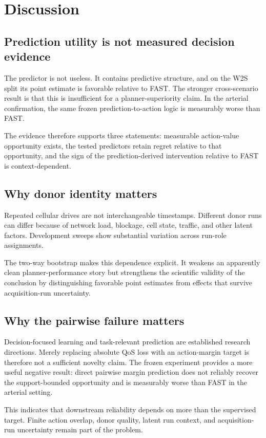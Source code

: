 \documentclass[journal]{IEEEtran}
\begin{document}
\section{Discussion}
\subsection{Prediction utility is not measured decision evidence}
The predictor is not useless. It contains predictive structure, and on the W2S split its point estimate is favorable relative to FAST. The stronger cross-scenario result is that this is insufficient for a planner-superiority claim. In the arterial confirmation, the same frozen prediction-to-action logic is measurably worse than FAST.

The evidence therefore supports three statements: measurable action-value opportunity exists, the tested predictors retain regret relative to that opportunity, and the sign of the prediction-derived intervention relative to FAST is context-dependent.

\subsection{Why donor identity matters}
Repeated cellular drives are not interchangeable timestamps. Different donor runs can differ because of network load, blockage, cell state, traffic, and other latent factors. Development sweeps show substantial variation across run-role assignments.

The two-way bootstrap makes this dependence explicit. It weakens an apparently clean planner-performance story but strengthens the scientific validity of the conclusion by distinguishing favorable point estimates from effects that survive acquisition-run uncertainty.

\subsection{Why the pairwise failure matters}
Decision-focused learning and task-relevant prediction are established research directions. Merely replacing absolute QoS loss with an action-margin target is therefore not a sufficient novelty claim. The frozen experiment provides a more useful negative result: direct pairwise margin prediction does not reliably recover the support-bounded opportunity and is measurably worse than FAST in the arterial setting.

This indicates that downstream reliability depends on more than the supervised target. Finite action overlap, donor quality, latent run context, and acquisition-run uncertainty remain part of the problem.
\end{document}
